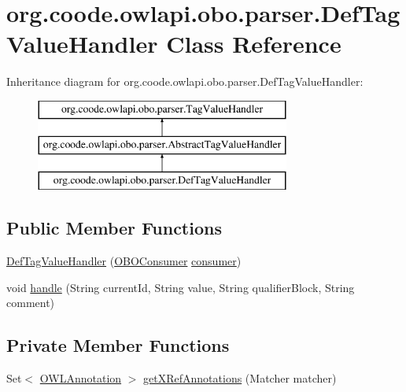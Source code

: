 \hypertarget{classorg_1_1coode_1_1owlapi_1_1obo_1_1parser_1_1_def_tag_value_handler}{\section{org.\-coode.\-owlapi.\-obo.\-parser.\-Def\-Tag\-Value\-Handler Class Reference}
\label{classorg_1_1coode_1_1owlapi_1_1obo_1_1parser_1_1_def_tag_value_handler}
}
Inheritance diagram for org.\-coode.\-owlapi.\-obo.\-parser.\-Def\-Tag\-Value\-Handler\-:\begin{figure}[H]
\begin{center}
\leavevmode
\includegraphics[height=3.000000cm]{classorg_1_1coode_1_1owlapi_1_1obo_1_1parser_1_1_def_tag_value_handler}
\end{center}
\end{figure}
\subsection*{Public Member Functions}
\begin{DoxyCompactItemize}
\item 
\hyperlink{classorg_1_1coode_1_1owlapi_1_1obo_1_1parser_1_1_def_tag_value_handler_a245f60c03dfd41600d0e06eaccaca105}{Def\-Tag\-Value\-Handler} (\hyperlink{classorg_1_1coode_1_1owlapi_1_1obo_1_1parser_1_1_o_b_o_consumer}{O\-B\-O\-Consumer} \hyperlink{classorg_1_1coode_1_1owlapi_1_1obo_1_1parser_1_1_abstract_tag_value_handler_ab27f1ff22d15640c5f81585f18265137}{consumer})
\item 
void \hyperlink{classorg_1_1coode_1_1owlapi_1_1obo_1_1parser_1_1_def_tag_value_handler_a1954c24976b5fcd2a39017c8e08c3fbf}{handle} (String current\-Id, String value, String qualifier\-Block, String comment)
\end{DoxyCompactItemize}
\subsection*{Private Member Functions}
\begin{DoxyCompactItemize}
\item 
Set$<$ \hyperlink{interfaceorg_1_1semanticweb_1_1owlapi_1_1model_1_1_o_w_l_annotation}{O\-W\-L\-Annotation} $>$ \hyperlink{classorg_1_1coode_1_1owlapi_1_1obo_1_1parser_1_1_def_tag_value_handler_a191c98983b1f753412e2d14432dff5d9}{get\-X\-Ref\-Annotations} (Matcher matcher)
\end{DoxyCompactItemize}
